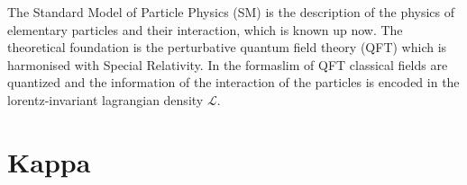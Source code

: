 The Standard Model of Particle Physics (SM) is the description of the physics of elementary particles and their interaction, which is known up now. The theoretical foundation is the perturbative quantum field theory (QFT) which is harmonised with Special Relativity. In the formaslim of QFT classical fields are quantized and the information of the interaction of the particles is encoded in the lorentz-invariant lagrangian density $\mathcal{L}$. 

\section{Kappa}
